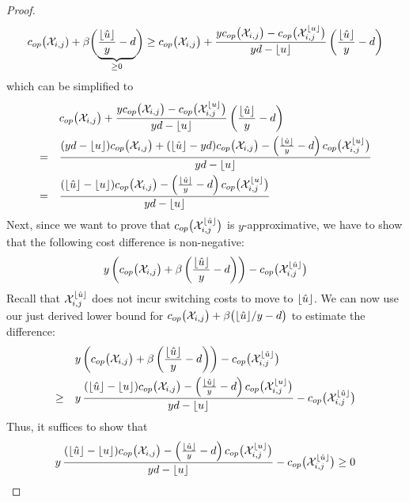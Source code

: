 \begin{proof}
\begin{equation*}
	c_{op}\bigl(\mathcal{X}_{i,j})+\beta\biggl(\underbrace{\frac{\lfloor\hat{u}\rfloor}{y}-d}_{\ge 0}\biggr)\ge c_{op}\bigl(\mathcal{X}_{i,j}\bigr)+\frac{yc_{op}\bigl(\mathcal{X}_{i,j}\bigr)-c_{op}\bigl(\mathcal{X}_{i,j}^{\lfloor u\rfloor}\bigr)}{yd-\lfloor u\rfloor}\left(\frac{\lfloor\hat{u}\rfloor}{y}-d\right)
\end{equation*}
which can be simplified to
\begin{align*}
	&c_{op}\bigl(\mathcal{X}_{i,j}\bigr)+\frac{yc_{op}\bigl(\mathcal{X}_{i,j}\bigr)-c_{op}\bigl(\mathcal{X}_{i,j}^{\lfloor u\rfloor}\bigr)}{yd-\lfloor u\rfloor}\left(\frac{\lfloor\hat{u}\rfloor}{y}-d\right)\\
	=\quad&\frac{(yd-\lfloor u\rfloor)c_{op}\bigl(\mathcal{X}_{i,j}\bigr)+(\lfloor\hat{u}\rfloor-yd)c_{op}\bigl(\mathcal{X}_{i,j}\bigr)-\left(\frac{\lfloor\hat{u}\rfloor}{y}-d\right)c_{op}\bigl(\mathcal{X}_{i,j}^{\lfloor u\rfloor}\bigr)}{yd-\lfloor u\rfloor}\\
	=\quad&\frac{(\lfloor\hat{u}\rfloor-\lfloor u\rfloor)c_{op}\bigl(\mathcal{X}_{i,j}\bigr)-\left(\frac{\lfloor\hat{u}\rfloor}{y}-d\right)c_{op}\bigl(\mathcal{X}_{i,j}^{\lfloor u\rfloor}\bigr)}{yd-\lfloor u\rfloor}
\end{align*}
Next, since we want to prove that $c_{op}\bigl(\mathcal{X}_{i,j}^{\lfloor\hat{u}\rfloor}\bigr)$ is $y$-approximative, we have to show that the following cost difference is non-negative:
\begin{align*}
	y\left(c_{op}\bigl(\mathcal{X}_{i,j}\bigr)+\beta\left(\frac{\lfloor\hat{u}\rfloor}{y}-d\right)\right)-c_{op}\bigl(\mathcal{X}_{i,j}^{\lfloor\hat{u}\rfloor}\bigr)
\end{align*}
Recall that $\mathcal{X}_{i,j}^{\lfloor\hat{u}\rfloor}$ does not incur switching costs to move to $\lfloor\hat{u}\rfloor$. We can now use our just derived lower bound for $c_{op}\bigl(\mathcal{X}_{i,j}\bigr)+\beta\bigl(\lfloor\hat{u}\rfloor/y-d\bigr)$ to estimate the difference:
\begin{align*}
	&y\left(c_{op}\bigl(\mathcal{X}_{i,j}\bigr)+\beta\left(\frac{\lfloor\hat{u}\rfloor}{y}-d\right)\right)-c_{op}\bigl(\mathcal{X}_{i,j}^{\lfloor\hat{u}\rfloor}\bigr)\\
	\ge\quad&y\, \frac{(\lfloor\hat{u}\rfloor-\lfloor u\rfloor)c_{op}\bigl(\mathcal{X}_{i,j}\bigr)-\left(\frac{\lfloor\hat{u}\rfloor}{y}-d\right)c_{op}\bigl(\mathcal{X}_{i,j}^{\lfloor u\rfloor}\bigr)}{yd-\lfloor u\rfloor}-c_{op}\bigl(\mathcal{X}_{i,j}^{\lfloor\hat{u}\rfloor}\bigr)
\end{align*}
Thus, it suffices to show that
\begin{align*}
	y\,\frac{(\floor{\hat{u}}-\floor{u})\opcosts\bigl(\mx_{i,j}\bigr)-\left(\frac{\floor{\hat{u}}}{y}-d\right)\opcosts\bigl(\mx_{i,j}^{\floor{u}}\bigr)}{yd-\floor{u}}-\opcosts\bigl(\mx_{i,j}^{\floor{\hat{u}}}\bigr)\ge 0

\end{align*}
\end{proof}

